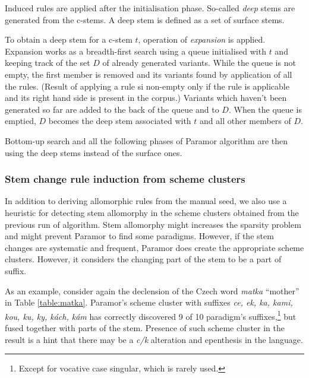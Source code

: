 \documentclass{itatnew}
\newcommand{\gloss}[2]{\emph{#1} ``#2''}
\newcommand{\e}[1]{\textit{#1}} %
\newcommand{\todojd}[1]{} %
\begin{document}
\noindent
Induced rules are applied after the initialisation phase. So-called \emph{deep} stems are generated from the c-stems. A deep stem is defined as a set of surface stems.

To obtain a deep stem for a c-stem $t$, operation of \emph{expansion} is applied. Expansion works as a breadth-first search using a queue initialised with $t$ and keeping track of the set $D$ of already generated variants. While the queue is not empty, the first member is removed and its variants found by application of all the rules. (Result of applying a rule si non-empty only if the rule is applicable and its right hand side is present in the corpus.) Variants which haven't been generated so far are added to the back of the queue and to $D$. When the queue is emptied, $D$ becomes the deep stem associated with $t$ and all other members of $D$. \todojd{Any reason why? Why not keep the deep stem ambiguous? This roughly means that rules are obligatory (If I can produce another allomorph, I have to). Some example, possibly mention where it helps and where it hurts. \textbf{RK:} No special reason for that. I may try an experiment where i keep the `surface' stems }

Bottom-up search and all the following phases of Paramor algorithm are then using the deep stems instead of the surface ones.

\subsubsection{Stem change rule induction from scheme clusters}
\label{sec:autoseed}

\noindent
In addition to deriving allomorphic rules from the manual seed, we also use a heuristic for detecting stem allomorphy in the scheme clusters obtained from the previous run of algorithm.
%
Stem allomorphy might increases the sparsity problem and might prevent Paramor to find some paradigms. However, if the stem changes are systematic and frequent, Paramor does create the appropriate scheme clusters. However, it considers the changing part of the stem to be a part of suffix.

As an example, consider again the declension of the Czech word \gloss{matka}{mother} in Table \ref{table:matka}. Paramor's scheme cluster with suffixes \emph{ce, ek, ka, kami, kou, ku, ky, kách, kám} has correctly discovered 9 of 10 paradigm's suffixes,\footnote{Except for vocative case singular, which is rarely used.} but fused together with parts of the stem.
Presence of such scheme cluster in the result is a hint that there may be a \e{c/k} alteration and epenthesis in the language.
\end{document}

